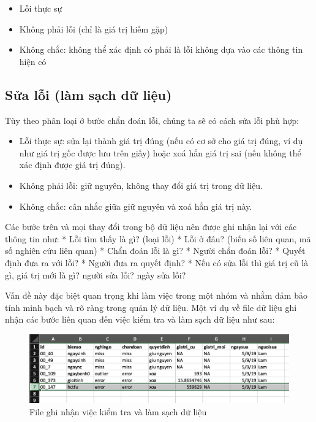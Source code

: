 \documentclass[]{tufte-book}
\providecommand{\tightlist}{%
  \setlength{\itemsep}{0pt}\setlength{\parskip}{0pt}}
\begin{document}
\begin{itemize}
\tightlist
\item
  Lỗi thực sự
\item
  Không phải lỗi (chỉ là giá trị hiếm gặp)
\item
  Không chắc: không thể xác định có phải là lỗi không dựa vào các thông tin hiện có
\end{itemize}

\hypertarget{sa-li-lam-sach-d-liu}{%
\subsection{Sửa lỗi (làm sạch dữ liệu)}\label{sa-li-lam-sach-d-liu}}

Tùy theo phân loại ở bước chẩn đoán lỗi, chúng ta sẽ có cách sửa lỗi phù hợp:

\begin{itemize}
\tightlist
\item
  Lỗi thực sự: sửa lại thành giá trị đúng (nếu có cơ sở cho giá trị đúng, ví dụ như giá trị gốc được lưu trên giấy) hoặc xoá hẳn giá trị sai (nếu không thể xác định được giá trị đúng).
\item
  Không phải lỗi: giữ nguyên, không thay đổi giá trị trong dữ liệu.
\item
  Không chắc: cân nhắc giữa giữ nguyên và xoá hẳn giá trị này.
\end{itemize}

Các bước trên và mọi thay đổi trong bộ dữ liệu nên được ghi nhận lại với các thông tin như:
* Lỗi tìm thấy là gì? (loại lỗi)
* Lỗi ở đâu? (biến số liên quan, mã số nghiên cứu liên quan)
* Chẩn đoán lỗi là gì?
* Người chẩn đoán lỗi?
* Quyết định đưa ra với lỗi?
* Người đưa ra quyết định?
* Nếu có sửa lỗi thì giá trị cũ là gì, giá trị mới là gì? người sửa lỗi? ngày sửa lỗi?

Vấn đề này đặc biệt quan trọng khi làm việc trong một nhóm và nhằm đảm bảo tính minh bạch và rõ ràng trong quản lý dữ liệu. Một ví dụ về file dữ liệu ghi nhận các bước liên quan đến việc kiểm tra và làm sạch dữ liệu như sau:

\begin{figure}

{\centering \includegraphics[width=0.8\linewidth]{figures/02_04} 

}

\caption[File ghi nhận việc kiểm tra và làm sạch dữ liệu]{File ghi nhận việc kiểm tra và làm sạch dữ liệu}\label{fig:documentclean}
\end{figure}
\end{document}
